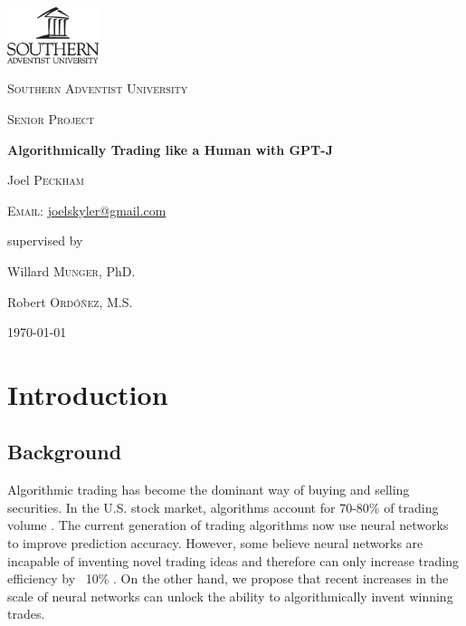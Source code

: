 \documentclass[conference]{IEEEtran}
\begin{document}
\begin{titlepage}
	\centering
	\includegraphics[width=0.2\textwidth]{logoBlackV.eps}\par
	\vspace{1.5cm}
	{\scshape\LARGE Southern Adventist University \par}
	\vfill
	{\scshape\Large Senior Project\par}
	\vspace{1cm}
	{\huge\bfseries Algorithmically Trading like a Human with GPT-J\par}
	\vspace{1cm}
	{\large Joel \textsc{Peckham}\par}
	\textsc{Email:} \href{mailto:joelskyler@gmail.com}{joelskyler@gmail.com}\par
	
	\vspace{0.5cm}
	supervised by\par
	Willard \textsc{Munger}, PhD.\par
	Robert \textsc{Ordóñez}, M.S.
	\vfill
	\begin{abstract}
		We explore the viability of using GPT-J, a 6 billion parameter natural language processing model, as a stock market trading indicator. This novel approach leverages both GPT-J's ability to process large, data-rich inputs, and GPT-J's deep understanding of the world. We propose that with a sufficient understanding of language, an AI model can be used to predict the future value of a stock. We test this hypothesis using both statistical models and real-world back-tesing data. We hope to demonstrate that our model is able to predict the future value of a stock with a higher degree of accuracy than previous models.
	\end{abstract}
	
	\vfill
	
	{\large \today\par}
\end{titlepage}
\onecolumn
\tableofcontents
\listoffigures
\listoftables
\twocolumn
\section{Introduction}
\subsection{Background}
Algorithmic trading has become the dominant way of buying and selling securities. In the U.S. stock market, algorithms account for 70-80\% of trading volume \cite{Samuelsson2021}. The current generation of trading algorithms now use neural networks to improve prediction accuracy. However, some believe neural networks are incapable of inventing novel trading ideas and therefore can only increase trading efficiency by ~10\% \cite{Vonko2021}. On the other hand, we propose that recent increases in the scale of neural networks can unlock the ability to algorithmically invent winning trades. 
\end{document}
